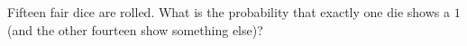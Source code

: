 Fifteen fair dice are rolled. What is the probability that exactly one die shows a $1$ (and the other fourteen show something else)?

